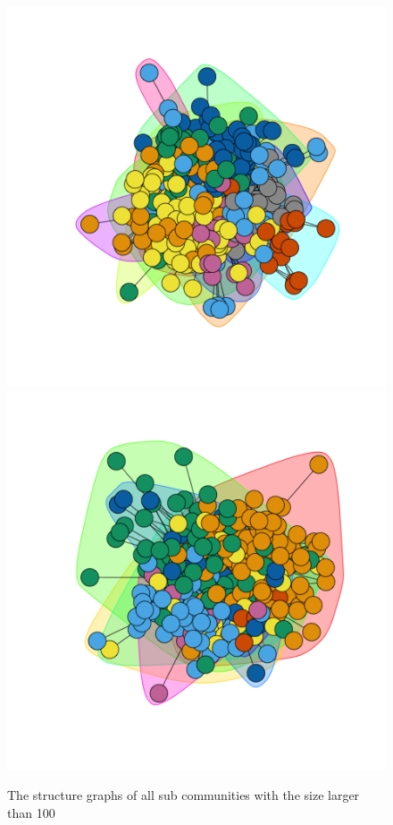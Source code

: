 \documentclass{article}
\begin{document}
\begin{figure}[htbp]
{\begin{minipage}[b]{0.4\textwidth}
\includegraphics[width=1\textwidth]{sub_com_4.png}\\
\includegraphics[width=1\textwidth]{sub_com_6.png}
\end{minipage}
}
\caption{The structure graphs of all sub communities with the size larger than 100}
\label{fig:all_sub}
\end{figure}
\end{document}
